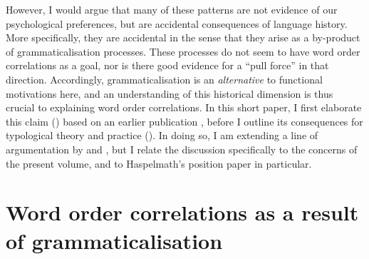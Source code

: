 \documentclass[output=paper]{langsci/langscibook}
\begin{document}
However, I would argue that many of these patterns are not evidence of our psychological preferences, but are accidental consequences of language history. More specifically, they are accidental in the sense that they arise as a by-product of grammaticalisation processes. These processes do not seem to have word order correlations as a goal, nor is there good evidence for a “pull force” in that direction. Accordingly, grammaticalisation is an \textit{alternative} to functional motivations here, and an understanding of this historical dimension is thus crucial to explaining word order correlations. In this short paper, I first elaborate this claim () based on an earlier publication \citep{Collins2012}, before I outline its consequences for typological theory and practice (). In doing so, I am extending a line of argumentation by \citet{Givón1971} and \citet{Aristar1991}, but I relate the discussion specifically to the concerns of the present volume, and to Haspelmath’s position paper in particular.

\section{Word order correlations as a result of grammaticalisation}\label{sec:collins:2}
\end{document}
